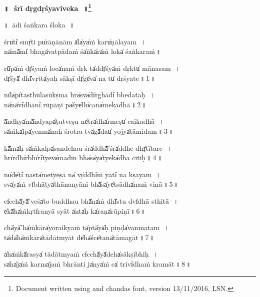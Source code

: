 \documentclass[parskip, 12pt, DIV=16, pagenumber=head,top, enableddeprecatedfontcommands]{scrartcl}
\renewcommand{\thefootnote}{\fnsymbol{footnote}} %
\begin{document}

\vspace{-1.5cm}

\begin{center}
\textbf{{\Huge॥\,~śrī dṛ॒gdṛśyaviveka॒\,~॥\LARGE\let\thefootnote\relax\footnote{\color{lightgray} Document written using \XeLaTeX{} and chandas font, version 13/11/2016, LSN.}}}
\end{center}
\Large

\centering	

॥~ādi śaṅkara śloka\,~॥

śru̍ti̍ smṛ̍ti pu̍rāṇā॒nām ā̍la̍ya̍ṁ karu̍ṇāla॒ya॒m\,~।\\
na̍mā̍mi̍ bhaga̍vatpā॒daṁ śa̍ṅka̍ra̍ṁ loka̍ śaṅka॒ra॒ṁ\,॥

\vspace{0.5cm}
\Large

rū̍pa̍ṁ dṛ̍śyaṁ loca̍na॒ṁ dṛk ta̍ddṛ̍śya̍ṁ dṛktu̍ māna॒sa॒m\,~।\\
dṛ̍śyā̍ dhī̍vṛtta̍yaḥ sā॒kṣī dṛ̍ge̍va̍ na tu̍ dṛśya॒te॒\,॥\,1\,॥

nī̍la̍pī̍tasthū॒lasū॒kṣma hra̍sva̍dī̍rghādi̍ bheda॒ta॒ḥ॒\,~।\\
nā̍nā̍vi̍dhāni̍ rūpā॒ṇi pa̍śye̍llo̍cana̍meka॒dhā॒\,॥\,2\,॥

ā̍ndhya̍mā̍ndyapa̍ṭutve॒ṣu ne̍tra̍dha̍rmeṣu̍ caika॒dhā॒\,~।\\
sa̍ṁka̍lpa̍yenma̍naḥ śro॒tra tva̍gā̍dau̍ yojya̍tāmi॒da॒m\,॥\,3\,॥

kā̍ma̍ḥ sa̍ṁkalpa̍sande॒hau śra̍ddhā̍'śra̍ddhe dhṛ̍tīta॒re॒\,~।\\
hrī̍rdhī̍rbhī̍ri̍tyeva̍mā॒dīn bhā̍sa̍ya̍tyeka̍dhā ci॒ti॒ḥ॒\,॥\,4\,॥

no̍de̍ti̍ nāsta̍metye॒ṣā na̍ vṛ̍ddhi̍ṁ yāti̍ na kṣa॒ya॒m\,~।\\
sva̍ya̍ṁ vi̍bhātya̍thāna॒nyāni bhā̍sa̍ye̍tsādha̍naṁ vi॒nā॒\,॥\,5\,॥

ci̍cchā̍yā̍'veśa̍to bu॒ddhau bhā̍na̍ṁ dhī̍stu dvi̍dhā sthi॒tā॒\,~।\\
e̍kā̍ha̍ṁkṛti̍ranyā॒ syāt a̍nta̍ḥ ka̍raṇa̍rūpi॒ṇī॒\,॥\,6\,॥

chā̍yā̍'ha̍ṁkāra̍yorai॒kyaṁ ta̍ptā̍ya̍ḥ piṇḍa̍vanma॒ta॒m\,~।\\
ta̍da̍ha̍ṁkāra̍tādā॒tmyāt de̍ha̍śce̍tana̍tāma॒gā॒t॒\,॥\,7\,॥

a̍ha̍ṁkā̍rasya̍ tādā॒tmyaṁ ci̍cchā̍yā̍deha̍sākṣi॒bhi॒ḥ\,~।\\
sa̍ha̍ja̍ṁ karma̍jaṁ bhrā॒nti ja̍nya̍ṁ ca̍ trivi̍dhaṁ kra॒mā॒t\,॥\,8\,॥
\end{document}
